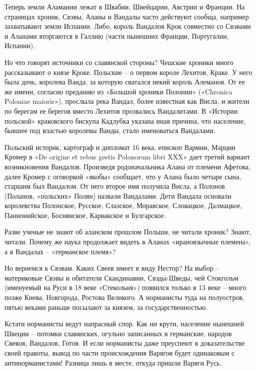 Теперь земли Аламании лежат в Швабии,  Швейцарии, Австрии и Франции. На страницах хроник, Свэвы, Аланы и Вандалы часто действуют сообща, например захватывают земли Испании. Либо, король Вандалов Крок совместно со Свэвами и Аланами вторгаются в Галлию (части нынешних Франции, Португалии, Испании).%

Но что говорят источники со славянской стороны? Чешские хроники много рассказывают о князе Кроке. Польские – о первом короле Лехитов, Краке. У него была дочь, королева Ванда, за которую сватался некий король Алеманов. От ее же имени, согласно преданию из «Большой хроники Полонии» («Chronica Poloniae maioris»), прослыла река Вандал, более известная как Висла, и жители по берегам ее берегов вместо Лехитов прозвались Вандалитами. В «Истории польской» краковского бискупа Кадлубка указана иная причина, что население, бывшее под властью королевы Ванды, стало именоваться Вандалами.

Польский историк, картограф и дипломат 16 века, епископ Вармии, Марцин Кромер в «De origine et rebus gestis Polonorum libri XXX» дает третий вариант возникновения Вандалов. Произведя родоначальника Алана от племени Афетова, далее Кромер с оговоркой «якобы» сообщает, что у Алана было четыре сына, старшим был Вандалом. От него второе имя получила Висла, а Полонов (Поланов, «польских» Полян) назвали Вандалами. Дети Вандала основали королевства Полонское, Русское, Слазское, Моравское, Словацкое, Далмацкое, Паннонийское, Боснянское, Карвакское и Булгарское.

Разве ученые не знают об аланском прошлом Польши, не читали хроник? Знают, читали. Почему же наука продолжает видеть в Аланах «ираноязычные племена», а в Вандалах – «германское племя»?

Но вернемся к Свэвам. Каких Свеев имеет в виду Нестор? На выбор – материковые Свэвы и обитатели Скандинавии, Свэды-Шведы, чей Стокгольм (именуемый на Руси в 18 веке «Стекольня») появился только в 13 веке – много позже Киева, Новгорода, Ростова Великого. А норманисты туда на полуостров, пятью веками раньше посылают за князем, за государственностью.

Кстати норманисты ведут напрасный спор. Как ни крути, население нынешней Швеции – потомки славянских, огульно записанных в германские, народов Свевов, Вандалов, Готов. И если норманисты даже преуспеют в доказательстве своей правоты, вывод по части происхождения Варягов будет одинаковым с антинорманистами! Разница лишь в месте, откуда пришли Варяги Русь.


